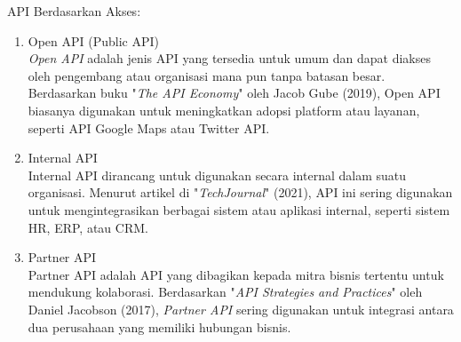 \begin{enumerate}[label*=\arabic*.,ref=\arabic*]
    API Berdasarkan Akses:
    \begin{enumerate}[label=\alph*.]
        \item Open API (Public API) \\
        \textit{Open API} adalah jenis API yang tersedia untuk umum dan dapat diakses oleh pengembang atau organisasi mana pun tanpa batasan besar. Berdasarkan buku "\textit{The API Economy}" oleh Jacob Gube (2019), Open API biasanya digunakan untuk meningkatkan adopsi platform atau layanan, seperti API Google Maps atau Twitter API.
        \item Internal API \\
        Internal API dirancang untuk digunakan secara internal dalam suatu organisasi. Menurut artikel di "\textit{TechJournal}" (2021), API ini sering digunakan untuk mengintegrasikan berbagai sistem atau aplikasi internal, seperti sistem HR, ERP, atau CRM.
        \item Partner API \\
        Partner API adalah API yang dibagikan kepada mitra bisnis tertentu untuk mendukung kolaborasi. Berdasarkan "\textit{API Strategies and Practices}" oleh Daniel Jacobson (2017), \textit{Partner API} sering digunakan untuk integrasi antara dua perusahaan yang memiliki hubungan bisnis.
    \end{enumerate}


\end{enumerate}
